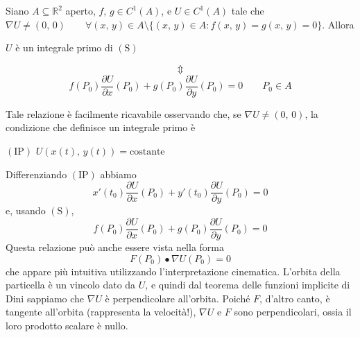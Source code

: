 \begin{obs}
Siano $A \subseteq \mathbb{R}^2$ aperto, $f,\,g \in C^1(A)$, e $U \in C^1(A)$ tale che $\nabla U \neq (0,\,0) \qquad \forall (x,\,y) \in A \setminus \lbrace (x,\,y) \in A : f(x,\,y) = g(x,\,y) = 0 \rbrace$. Allora
\begin{center}
$U$ è un integrale primo di $\mathrm{(S)}$
\end{center}
$$
\Updownarrow
$$\vskip 0pt
$$
f(P_0) \frac{\partial U}{\partial x}(P_0) + g(P_0) \frac{\partial U}{\partial y}(P_0) = 0 \qquad P_0 \in A
$$

Tale relazione è facilmente ricavabile osservando che, se $\nabla U \neq (0,\,0)$, la condizione che definisce un integrale primo è
\begin{center}
$\mathrm{(IP)}$
\hfill
$\displaystyle
U(x(t),\,y(t)) = \text{costante}
$
\hfill \null \\
\end{center}
Differenziando $\mathrm{(IP)}$ abbiamo
$$
x'(t_0) \frac{\partial U}{\partial x}(P_0) + y'(t_0) \frac{\partial U}{\partial y}(P_0) = 0 
$$
e, usando $\mathrm{(S)}$,
$$
f(P_0) \frac{\partial U}{\partial x}(P_0) + g(P_0) \frac{\partial U}{\partial y}(P_0) = 0
$$
Questa relazione può anche essere vista nella forma
$$
F(P_0) \bullet \nabla U(P_0) = 0
$$
che appare più intuitiva utilizzando l'interpretazione cinematica. L'orbita della particella è un vincolo dato da $U$, e quindi dal teorema delle funzioni implicite di Dini sappiamo che $\nabla U$ è perpendicolare all'orbita. Poiché $F$, d'altro canto, è tangente all'orbita (rappresenta la velocità!), $\nabla U$ e $F$ sono perpendicolari, ossia il loro prodotto scalare è nullo.
\end{obs}

